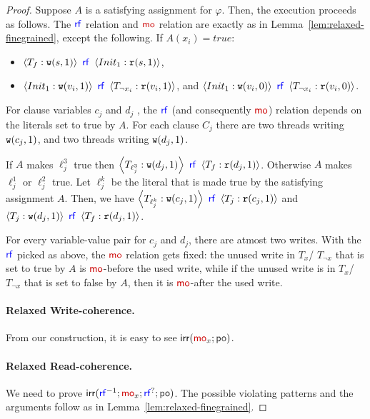 \begin{proof}
    Suppose $A$ is a satisfying assignment for $\varphi$. Then, the execution proceeds as follows. 
    The $\rf$ relation and $\mo$ relation are exactly as in Lemma~\ref{lem:relaxed-finegrained}, except the following.
    If $A(x_i) = true$:
    \begin{itemize}
        \item $\tuple{T_f: \wt(s, 1)}~\rf~\tuple{Init_1: \rd(s, 1)}$,
        \item $\tuple{Init_1: \wt(v_i, 1)}~\rf~\tuple{T_{\neg x_i}: \rd(v_i, 1)}$, and $\tuple{Init_1: \wt(v_i, 0)}~\rf~\tuple{T_{\neg x_i}: \rd(v_i, 0)}$. 
    \end{itemize} 
    For clause variables $c_j$ and $d_j$ , the $\rf$ (and consequently $\mo$) relation depends on the literals set to true by $A$. 
    For each clause $C_j$ there are two threads writing $\mathtt{w}(c_j, 1)$, and two threads writing $\mathtt{w}(d_j, 1)$. 
    
    If $A$ makes $\ell_j^3$ true then $\tuple{T_{\ell_j^3}: \wt(d_j, 1)}~\rf~\tuple{T_f: \rd(d_j, 1)}$. Otherwise $A$ makes $\ell_j^1$ or $\ell_j^2$ true. Let $\ell_j^k$ be the literal that is made true by the satisfying assignment $A$. Then, we have $\tuple{T_{\ell_j^k}: \wt(c_j, 1)}~\rf~\tuple{T_j: \rd(c_j, 1)}$ and $\tuple{T_j: \wt(d_j, 1)}~\rf~\tuple{T_f: \rd(d_j, 1)}$.

    For every variable-value pair for $c_j$ and $d_j$, there are atmost two writes. With the $\rf$ picked as above, the $\mo$ relation gets fixed: the unused write in $T_{x}$/ $T_{\neg x}$ that is set to true by $A$ is $\mo$-before the used write, while if the unused write is in $T_{x}$/ $T_{\neg x}$ that is set to false by $A$, then it is $\mo$-after the used write.    
    
    \paragraph*{Relaxed Write-coherence.} From our construction, it is easy to see $\irr(\mo_x; \po)$.

    \paragraph*{Relaxed Read-coherence.} We need to prove  $\irr(\rf^{-1}; \mo_x; \rf^{?}; \po)$. 
    The possible violating patterns and the arguments follow as in Lemma~\ref{lem:relaxed-finegrained}.


\end{proof}
